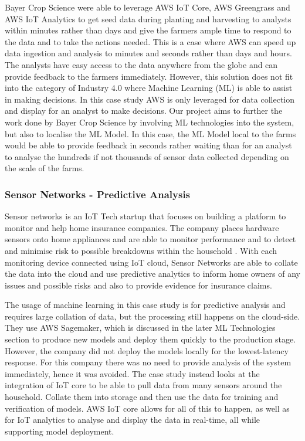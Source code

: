 Bayer Crop Science were able to leverage AWS IoT Core, AWS Greengrass and AWS IoT Analytics to get seed data during planting and harvesting to analysts within minutes rather than days and give the farmers ample time to respond to the data and to take the actions needed. This is a case where AWS can speed up data ingestion and analysis to minutes and seconds rather than days and hours. The analysts have easy access to the data anywhere from the globe and can provide feedback to the farmers immediately. However, this solution does not fit into the category of Industry 4.0 where Machine Learning (ML) is able to assist in making decisions. In this case study AWS is only leveraged for data collection and display for an analyst to make decisions. Our project aims to further the work done by Bayer Crop Science by involving ML technologies into the system, but also to localise the ML Model. In this case, the ML Model local to the farms would be able to provide feedback in seconds rather waiting than for an analyst to analyse the hundreds if not thousands of sensor data collected depending on the scale of the farms.

\subsubsection{Sensor Networks - Predictive Analysis}
Sensor networks is an IoT Tech startup that focuses on building a platform to monitor and help home insurance companies. The company places hardware sensors onto home appliances and are able to monitor performance and to detect and minimise risk to possible breakdowns within the household \cite{ch1_2_case_study_2}. With each monitoring device connected using IoT cloud, Sensor Networks are able to collate the data into the cloud and use predictive analytics to inform home owners of any issues and possible risks and also to provide evidence for insurance claims. 

The usage of machine learning in this case study is for predictive analysis and requires large collation of data, but the processing still happens on the cloud-side. They use AWS Sagemaker, which is discussed in the later ML Technologies section to produce new models and deploy them quickly to the production stage. However, the company did not deploy the models locally for the lowest-latency response. For this company there was no need to provide analysis of the system immediately, hence it was avoided. The case study instead looks at the integration of IoT core to be able to pull data from many sensors around the household. Collate them into storage and then use the data for training and verification of models. AWS IoT core allows for all of this to happen, as well as for IoT analytics to analyse and display the data in real-time, all while supporting model deployment.

